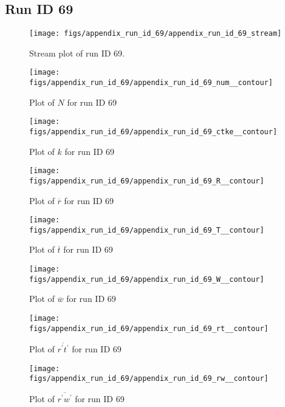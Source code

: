 \subsection{Run ID 69}
\begin{figure}[H]
\centering
\texttt{[image: figs/appendix\_run\_id\_69/appendix\_run\_id\_69\_stream]}
\caption{Stream plot of run ID 69.}
\label{fig:appendix_run_id_69_stream}
\end{figure}


\begin{figure}[H]
\centering
\texttt{[image: figs/appendix\_run\_id\_69/appendix\_run\_id\_69\_num\_\_contour]}
\caption{Plot of $N$ for run ID 69}
\label{fig:appendix_run_id_69_num__contour}
\end{figure}


\begin{figure}[H]
\centering
\texttt{[image: figs/appendix\_run\_id\_69/appendix\_run\_id\_69\_ctke\_\_contour]}
\caption{Plot of $k$ for run ID 69}
\label{fig:appendix_run_id_69_ctke__contour}
\end{figure}


\begin{figure}[H]
\centering
\texttt{[image: figs/appendix\_run\_id\_69/appendix\_run\_id\_69\_R\_\_contour]}
\caption{Plot of $\overline{r}$ for run ID 69}
\label{fig:appendix_run_id_69_R__contour}
\end{figure}


\begin{figure}[H]
\centering
\texttt{[image: figs/appendix\_run\_id\_69/appendix\_run\_id\_69\_T\_\_contour]}
\caption{Plot of $\overline{t}$ for run ID 69}
\label{fig:appendix_run_id_69_T__contour}
\end{figure}


\begin{figure}[H]
\centering
\texttt{[image: figs/appendix\_run\_id\_69/appendix\_run\_id\_69\_W\_\_contour]}
\caption{Plot of $\overline{w}$ for run ID 69}
\label{fig:appendix_run_id_69_W__contour}
\end{figure}


\begin{figure}[H]
\centering
\texttt{[image: figs/appendix\_run\_id\_69/appendix\_run\_id\_69\_rt\_\_contour]}
\caption{Plot of $\overline{r^\prime t^\prime}$ for run ID 69}
\label{fig:appendix_run_id_69_rt__contour}
\end{figure}


\begin{figure}[H]
\centering
\texttt{[image: figs/appendix\_run\_id\_69/appendix\_run\_id\_69\_rw\_\_contour]}
\caption{Plot of $\overline{r^\prime w^\prime}$ for run ID 69}
\label{fig:appendix_run_id_69_rw__contour}
\end{figure}


